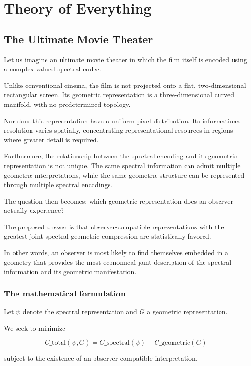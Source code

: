 \chapter{Theory of Everything}
\label{chap:theory-of-everything}


\section*{The Ultimate Movie Theater}

Let us imagine an ultimate movie theater in which the film itself is encoded using a complex-valued spectral codec.

Unlike conventional cinema, the film is not projected onto a flat, two-dimensional rectangular screen. Its geometric representation is a three-dimensional curved manifold, with no predetermined topology.

Nor does this representation have a uniform pixel distribution. Its informational resolution varies spatially, concentrating representational resources in regions where greater detail is required.

Furthermore, the relationship between the spectral encoding and its geometric representation is not unique. The same spectral information can admit multiple geometric interpretations,
while the same geometric structure can be represented through multiple spectral encodings.

The question then becomes: which geometric representation does an observer actually experience?

The proposed answer is that observer-compatible representations with the greatest joint spectral-geometric compression are statistically favored.

In other words, an observer is most likely to find themselves embedded in a geometry that provides the most economical joint description of the spectral information and its geometric manifestation.


\subsection*{The mathematical formulation}


Let \(\psi\) denote the spectral representation and \(G\) a geometric representation.

We seek to minimize

\[
C\_{\mathrm{total}}(\psi,G) = C\_{\mathrm{spectral}}(\psi) + C\_{\mathrm{geometric}}(G)
\]

subject to the existence of an observer-compatible interpretation.

